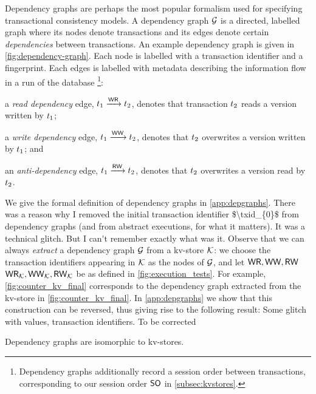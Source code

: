 Dependency graphs \cite{adya-icde,adya} are perhaps the most popular 
formalism used for specifying transactional consistency models. 
A dependency graph $\mathcal{G}$ is a directed, labelled graph where its
nodes denote transactions and its edges denote certain \emph{dependencies} between transactions.  
An example dependency graph is given in \cref{fig:dependency-graph}.
Each node is labelled with a transaction identifier and a fingerprint.
Each edges is labelled with metadata describing the information flow in a run of the database%
\footnote{Dependency graphs additionally record a session order between transactions, corresponding to our session order $\mathsf{SO}$ in \cref{subsec:kvstores}.}:
\begin{enumerate*}
	\item a \emph{read dependency} edge, $t_1 \xrightarrow{\mathsf{WR}} t_2$, denotes
that transaction $t_2$ reads a version written by $t_1$;
	\item a \emph{write dependency} edge, $t_1 \xrightarrow{\mathsf{WW}} t_2$, denotes that $t_2$ overwrites a version written by $t_1$; and 
	\item an \emph{anti-dependency} edge, $t_1 \xrightarrow{\mathsf{RW}} t_2$, denotes that $t_2$ overwrites a version read by $t_2$. 
\end{enumerate*}
We give the formal definition of dependency graphs in \cref{app:depgraphs}.
%
\ac{There was a reason why I removed the initial transaction identifier $\txid_{0}$ 
from dependency graphs (and from abstract executions, for what it matters). It was 
a technical glitch. But I can't remember exactly what was it.}
%
Observe that we can always \emph{extract} a dependency graph  $\mathcal{G}$ from a kv-store $\mathcal{K}$:
we choose the transaction identifiers appearing in $\mathcal{K}$ as the nodes of $\mathcal{G}$, 
and let $\mathsf{WR}, \mathsf{WW}, \mathsf{RW}$  $\mathsf{WR}_{\mathcal{K}}, \mathsf{WW}_{\mathcal{K}}, \mathsf{RW}_{\mathcal{K}}$ be as defined in \cref{fig:execution_tests}.
For example, \cref{fig:counter_kv_final} corresponds to the dependency graph extracted from the kv-store in \cref{fig:counter_kv_final}.
In \cref{app:depgraphs} we show that this construction can be reversed, thus giving 
rise to the following result: 
%
\ac{Some glitch with values, transaction identifiers. To be corrected} 
\begin{theorem}
\label{thm:kv_graph_isomorph}
Dependency graphs are isomorphic to kv-stores.
\end{theorem}


